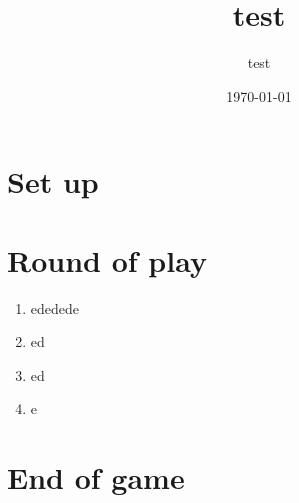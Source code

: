 \documentclass{article}%
\title{test}%
\author{test}%
\date{\today}%
\begin{document}
%
\pagestyle{empty}%
\normalsize%
\maketitle%
\section{ Set up
}%
\label{sec:Setup}%

%
\section{ Round of play
}%
\label{sec:Roundofplay}%
\begin{enumerate}%
\item%
%
 ededede
%
\item%
%
 ed
%
\item%
%
 ed
%
\item%
%
 e
%
\end{enumerate}

%
\section{ End of game}%
\label{sec:Endofgame}%

%
\end{document}
